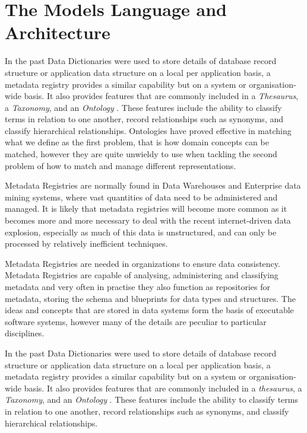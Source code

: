 \section{The Models Language and Architecture}

In the past Data Dictionaries were used to store details of database record structure or application data structure on a local per application basis, a metadata registry provides a similar capability but on a system or organisation-wide basis. It also provides features that are commonly included in a \emph{Thesaurus}, a \emph{Taxonomy}, and an \emph{Ontology} . These features include the ability to classify terms in relation to one another, record relationships such as synonyms, and classify hierarchical relationships. Ontologies have proved effective in matching what we define as the first problem, that is how domain concepts can be matched, however they are quite unwieldy to use when tackling the second problem of how to match and manage different representations.

Metadata Registries are normally found in Data Warehouses and Enterprise data mining systems, where vast quantities of data need to be administered and managed. It is likely that metadata registries will become more common as it becomes more and more necessary to deal with the recent internet-driven data explosion, especially as much of this data is unstructured, and can only be processed by relatively inefficient techniques.



Metadata Registries are needed in organizations to ensure data consistency. Metadata Registries are capable of analysing, administering and classifying metadata and very often in practise they also function as repositories for metadata, storing the schema and blueprints for data types and structures. The ideas and concepts that are stored in data systems form the basis of executable software systems, however many of the details are peculiar to particular disciplines.  

In the past Data Dictionaries were used to store details of database record structure or application data structure on a local per application basis, a metadata registry provides a similar capability but on a system or organisation-wide basis. It also provides features that are commonly included in a \emph{thesaurus}, a \emph{Taxonomy}, and an \emph{Ontology} . These features include the ability to classify terms in relation to one another, record relationships such as synonyms, and classify hierarchical relationships.

